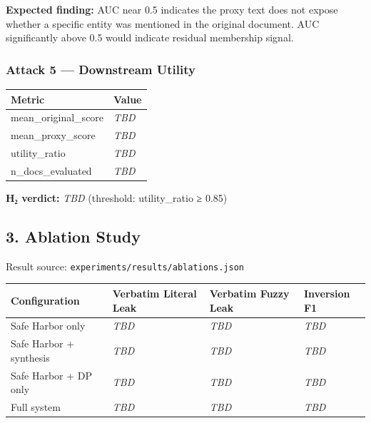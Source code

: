 \textbf{Expected finding:} AUC near 0.5 indicates the proxy text does
not expose whether a specific entity was mentioned in the original
document. AUC significantly above 0.5 would indicate residual membership
signal.

\subsubsection{Attack 5 --- Downstream
Utility}\label{attack-5-downstream-utility}

{\def\LTcaptype{none} %
\begin{longtable}[]{@{}ll@{}}
\toprule\noalign{}
Metric & Value \\
\midrule\noalign{}
\endhead
\bottomrule\noalign{}
\endlastfoot
mean\_original\_score & \emph{TBD} \\
mean\_proxy\_score & \emph{TBD} \\
utility\_ratio & \emph{TBD} \\
n\_docs\_evaluated & \emph{TBD} \\
\end{longtable}
}

\textbf{H₂ verdict:} \emph{TBD} (threshold: utility\_ratio ≥ 0.85)

\subsection{3. Ablation Study}\label{ablation-study}

Result source: \texttt{experiments/results/ablations.json}

{\def\LTcaptype{none} %
\begin{longtable}[]{@{}
  >{\raggedright\arraybackslash}p{}
  >{\raggedright\arraybackslash}p{}
  >{\raggedright\arraybackslash}p{}
  >{\raggedright\arraybackslash}p{}@{}}
\toprule\noalign{}
\begin{minipage}[b]{\linewidth}\raggedright
Configuration
\end{minipage} & \begin{minipage}[b]{\linewidth}\raggedright
Verbatim Literal Leak
\end{minipage} & \begin{minipage}[b]{\linewidth}\raggedright
Verbatim Fuzzy Leak
\end{minipage} & \begin{minipage}[b]{\linewidth}\raggedright
Inversion F1
\end{minipage} \\
\midrule\noalign{}
\endhead
\bottomrule\noalign{}
\endlastfoot
Safe Harbor only & \emph{TBD} & \emph{TBD} & \emph{TBD} \\
Safe Harbor + synthesis & \emph{TBD} & \emph{TBD} & \emph{TBD} \\
Safe Harbor + DP only & \emph{TBD} & \emph{TBD} & \emph{TBD} \\
Full system & \emph{TBD} & \emph{TBD} & \emph{TBD} \\
\end{longtable}
}

